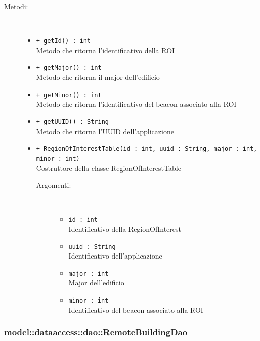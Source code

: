 \documentclass[../DefinizioneDiProdotto.tex]{subfiles}
\begin{document}
\begin{description}
\begin{itemize}
\end{itemize}
\item[Metodi:] \
\begin{itemize}
\item \texttt{+ getId() : int}\\
Metodo che ritorna l'identificativo della ROI
 \item \texttt{+ getMajor() : int}\\
Metodo che ritorna il major dell'edificio
 \item \texttt{+ getMinor() : int}\\
Metodo che ritorna l'identificativo del beacon associato alla ROI
 \item \texttt{+ getUUID() : String}\\
Metodo che ritorna l'UUID dell'applicazione
 \item \texttt{+ RegionOfInterestTable(id : int, uuid : String, major : int, minor : int)}\\
Costruttore della classe RegionOfInterestTable
 \begin{description}
\item[Argomenti:] \
\begin{itemize}
\item \texttt{id : int}\\
Identificativo della RegionOfInterest\item \texttt{uuid : String}\\
Identificativo dell'applicazione\item \texttt{major : int}\\
Major dell'edificio\item \texttt{minor : int}\\
Identificativo del beacon associato alla ROI\end{itemize}
\end{description}
\end{itemize}
\end{description}

\subsubsection{model::dataaccess::dao::RemoteBuildingDao}
\end{document}
